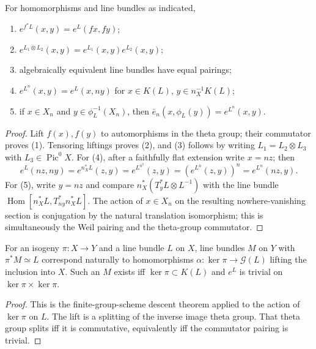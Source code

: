 \begin{proposition}
\label{mumford-prop-line-bundle-commutator-functorial}
For homomorphisms and line bundles as indicated,
\begin{enumerate}
\item $e^{f^*L}(x,y)=e^L(fx,fy)$;
\item $e^{L_1\otimes L_2}(x,y)=e^{L_1}(x,y)e^{L_2}(x,y)$;
\item algebraically equivalent line bundles have equal pairings;
\item $e^{L^n}(x,y)=e^L(x,ny)$ for $x\in K(L)$,
$y\in n_X^{-1}K(L)$;
\item if $x\in X_n$ and $y\in\phi_L^{-1}(X_n)$, then
$\bar e_n(x,\phi_L(y))=e^{L^n}(x,y)$.
\end{enumerate}
\end{proposition}
\begin{proof}
Lift $f(x),f(y)$ to automorphisms in the theta group; their commutator
proves (1). Tensoring liftings proves (2), and (3) follows by writing
$L_1=L_2\otimes L_3$ with $L_3\in\operatorname{Pic}^0X$. For (4), after a
faithfully flat extension write $x=nz$; then
\[
e^L(nz,ny)=e^{n_X^*L}(z,y)=e^{L^{n^2}}(z,y)
=(e^{L^n}(z,y))^n=e^{L^n}(nz,y).
\]
For (5), write $y=nz$ and compare
$n_X^*(T_y^*L\otimes L^{-1})$ with
the line bundle $\operatorname{Hom}[n_X^*L,T_{ny}^*n_X^*L]$. The action of $x\in X_n$ on
the resulting nowhere-vanishing section is conjugation by the natural
translation isomorphism; this is simultaneously the Weil pairing and the
theta-group commutator.
\end{proof}

\begin{theorem}
\label{mumford-thm-theta-descent}
For an isogeny $\pi:X\to Y$ and a line bundle $L$ on $X$, line bundles $M$
on $Y$ with $\pi^*M\simeq L$ correspond naturally to homomorphisms
$\alpha:\ker\pi\to\mathcal G(L)$ lifting the inclusion into $X$.
Such an $M$ exists iff $\ker\pi\subset K(L)$ and
$e^L$ is trivial on $\ker\pi\times\ker\pi$.
\end{theorem}
\begin{proof}
This is the finite-group-scheme descent theorem applied to the action of
$\ker\pi$ on $L$. The lift is a splitting of the inverse image theta group.
That theta group splits iff it is commutative, equivalently iff the
commutator pairing is trivial.
\end{proof}

